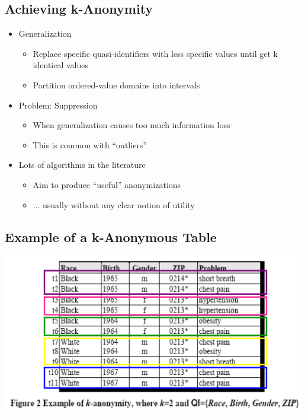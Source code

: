\documentclass[11pt]{article}
\theoremstyle{definition}
\begin{document}
\subsection{Achieving k-Anonymity}
\begin{itemize}
    \item Generalization
    \begin{itemize}
        \item Replace specific quasi-identifiers with less specific values until get k identical values
        \item Partition ordered-value domains into intervals
    \end{itemize}
    \item Problem: Suppression
    \begin{itemize}
        \item When generalization causes too much information loss
        \item This is common with “outliers”
    \end{itemize}
    \item Lots of algorithms in the literature
    \begin{itemize}
        \item Aim to produce “useful” anonymizations
        \item ... usually without any clear notion of utility
    \end{itemize}
\end{itemize}

\subsection{Example of a k-Anonymous Table}
\includegraphics[width=\textwidth/2]{18.png}
\end{document}
